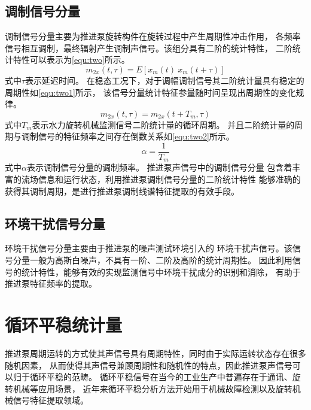 \subsection{调制信号分量}
调制信号分量主要为推进泵旋转构件在旋转过程中产生周期性冲击作用，
各频率信号相互调制，最终辐射产生调制声信号。该组分具有二阶的统计特性，
二阶统计特性可以表示为\autoref{equ:two}所示。
\begin{equation}
    \label{equ:two}
    m_{2x}\left ( t, \tau \right )  =E\left [ x_{m}\left ( t \right ) \ x_{m}\left ( t+\tau \right )  \right ] 
\end{equation}
式中$\tau$表示延迟时间。
在稳态工况下，对于调幅调制信号其二阶统计量具有稳定的周期性如\autoref{equ:two1}所示，
该信号分量统计特征参量随时间呈现出周期性的变化规律。
\begin{equation}
    \label{equ:two1}
    m_{2x}\left ( t, \tau \right )  =m_{2x}\left ( t+T_m, \tau \right )
\end{equation}
式中$T_m$表示水力旋转机械监测信号二阶统计量的循环周期。
并且二阶统计量的周期与调制信号的特征频率之间存在倒数关系如\autoref{equ:two2}所示。
\begin{equation}
    \label{equ:two2}
    \alpha =\frac{1}{T_{m} } 
\end{equation}
式中$\alpha$表示调制信号分量的调制频率。
推进泵声信号中的调制信号分量
包含着丰富的流场信息和运行状态，利用推进泵调制信号分量的二阶统计特性
能够准确的获得其调制周期，是进行推进泵调制线谱特征提取的有效手段。
\subsection{环境干扰信号分量}
环境干扰信号分量主要由于推进泵的噪声测试环境引入的
环境干扰声信号。该信号分量一般为高斯白噪声，不具有一阶、二阶及高阶的统计周期性。
因此利用信号的统计特性，能够有效的实现监测信号中环境干扰成分的识别和消除，
有助于推进泵特征频率的提取。

\section{循环平稳统计量}
推进泵周期运转的方式使其声信号具有周期特性，同时由于实际运转状态存在很多随机因素，
从而使得其声信号兼顾周期性和随机性的特点，因此推进泵声信号可以归于循环平稳的范畴。
循环平稳信号在当今的工业生产中普遍存在于通讯、旋转机械等应用场景，
近年来循环平稳分析方法开始用于机械故障检测以及旋转机械信号特征提取领域。
